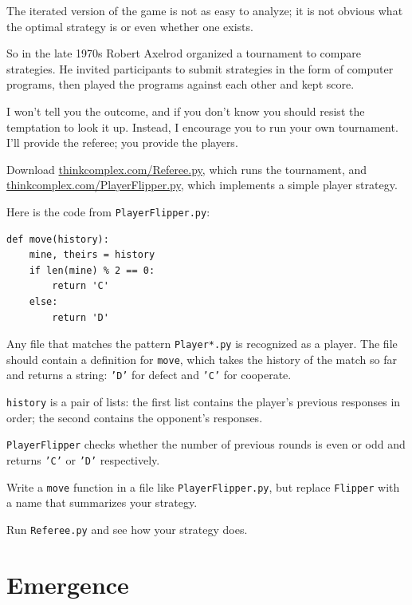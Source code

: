 \documentclass[10pt]{book}
\begin{document}
The iterated version of the game is not as easy to analyze; it
is not obvious what the optimal strategy is or even whether one
exists.

So in the late 1970s Robert Axelrod organized a tournament to compare
strategies.  He invited participants to submit strategies in the
form of computer programs, then played the programs against each other
and kept score.

I won't tell you the outcome, and if you don't know you should resist
the temptation to look it up.  Instead, I encourage you to run your
own tournament.  I'll provide the referee; you provide the players.

\begin{exercise}

Download \url{thinkcomplex.com/Referee.py}, which runs the tournament,
and \url{thinkcomplex.com/PlayerFlipper.py}, which implements a simple
player strategy.

Here is the code from {\tt PlayerFlipper.py}:

\begin{verbatim}
def move(history):
    mine, theirs = history
    if len(mine) % 2 == 0:
        return 'C'
    else:
        return 'D'
\end{verbatim}

Any file that matches the pattern {\tt Player*.py} is recognized
as a player.  The file should contain a definition for {\tt move},
which takes the history of the match so far and returns a string:
{\tt 'D'} for defect and {\tt 'C'} for cooperate.

{\tt history} is a pair of lists: the first list contains the
player's previous responses in order; the second contains the
opponent's responses.

{\tt PlayerFlipper} checks whether the number of previous rounds
is even or odd and returns {\tt 'C'} or {\tt 'D'} respectively.

Write a {\tt move} function in a file like {\tt PlayerFlipper.py}, but
replace {\tt Flipper} with a name that summarizes your strategy.

Run {\tt Referee.py} and see how your strategy does.

\end{exercise}


\section{Emergence}
\end{document}
